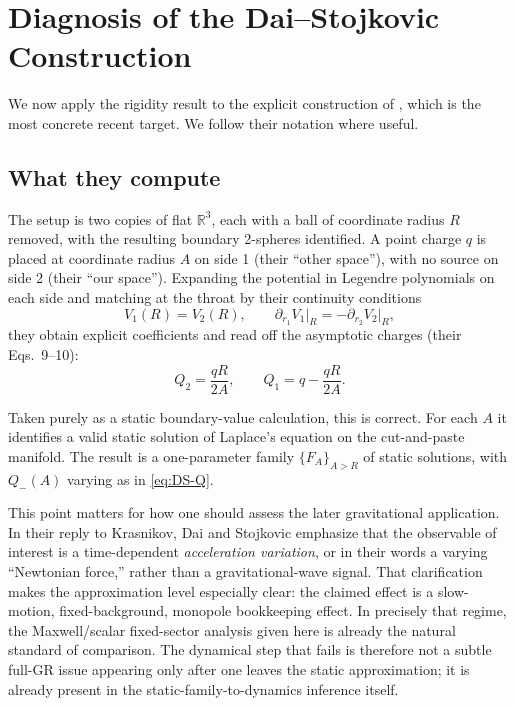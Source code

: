 \documentclass[aps,prd,onecolumn,nofootinbib,superscriptaddress]{revtex4-2}
\begin{document}
\section{Diagnosis of the Dai--Stojkovic Construction}
\label{sec:ds-diagnosis}

We now apply the rigidity result to the explicit construction of \cite{DaiStojkovic2019Observing}, which is the most concrete recent target. We follow their notation where useful.

\subsection{What they compute}

The setup is two copies of flat $\mathbb{R}^3$, each with a ball of coordinate radius $R$ removed, with the resulting boundary 2-spheres identified. A point charge $q$ is placed at coordinate radius $A$ on side 1 (their ``other space''), with no source on side 2 (their ``our space''). Expanding the potential in Legendre polynomials on each side and matching at the throat by their continuity conditions
\begin{equation}
V_1(R) = V_2(R), \qquad \partial_{r_1} V_1\big|_R = -\partial_{r_2} V_2\big|_R,
\end{equation}
they obtain explicit coefficients and read off the asymptotic charges (their Eqs.~9--10):
\begin{equation}
\label{eq:DS-Q}
Q_2 = \frac{qR}{2A}, \qquad Q_1 = q - \frac{qR}{2A}.
\end{equation}

Taken purely as a static boundary-value calculation, this is correct. For each $A$ it identifies a valid static solution of Laplace's equation on the cut-and-paste manifold. The result is a one-parameter family $\{F_A\}_{A>R}$ of static solutions, with $Q_-(A)$ varying as in \eqref{eq:DS-Q}.

This point matters for how one should assess the later gravitational application. In their reply to Krasnikov, Dai and Stojkovic emphasize that the observable of interest is a time-dependent \emph{acceleration variation}, or in their words a varying ``Newtonian force,'' rather than a gravitational-wave signal.\cite{DaiStojkovic2020ReplyObserving} That clarification makes the approximation level especially clear: the claimed effect is a slow-motion, fixed-background, monopole bookkeeping effect. In precisely that regime, the Maxwell/scalar fixed-sector analysis given here is already the natural standard of comparison. The dynamical step that fails is therefore not a subtle full-GR issue appearing only after one leaves the static approximation; it is already present in the static-family-to-dynamics inference itself.
\end{document}
